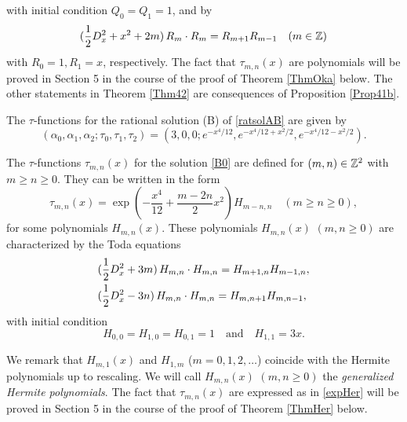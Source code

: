 with initial condition 
$ Q_0=Q_1=1 $, and by 
\begin{equation}
(\frac{1}{2}D_x^2+x^2+2m)\, 
R_{m}\cdot R_{m}=R_{m+1}R_{m-1}\quad(m\in{\Bbb Z})
\end{equation}
with $R_0=1, R_1=x$, respectively.
The fact that $\tau_{m,n}(x)$ are polynomials will be proved in 
Section 5 in the course of the proof of Theorem \ref{ThmOka} below. 
The other statements in Theorem \ref{Thm42} are consequences of 
Proposition \ref{Prop41b}.
\par\smallskip
The $\tau$-functions for the rational solution (B) of \eqref{ratsolAB} 
are given by
\begin{equation}\label{B0}
(\alpha_0,\alpha_1,\alpha_2; \tau_0,\tau_1,\tau_2)=
(3,0,0; e^{-x^4/12}, e^{-x^4/12+x^2/2},e^{-x^4/12-x^2/2}). 
\end{equation}
\begin{thm} \label{Thm43}
The $\tau$-functions $\tau_{m,n}(x)$ for the solution \eqref{B0}
are defined for $(m,n)\in{\Bbb Z}^2$ with  $m\ge n\ge0$. 
They can be written in the form
\begin{equation}\label{expHer}
\tau_{m,n}(x)=\exp\left(-\frac{x^4}{12}+\frac{m-2n}{2}x^2\right) H_{m-n,n}
\quad(m\ge n\ge 0), 
\end{equation}  
for some polynomials $H_{m,n}(x)$. 
These polynomials $H_{m,n}(x)$ $(m,n\ge 0)$ are characterized by 
the Toda equations
\begin{equation}
\begin{align}
&(\frac{1}{2}D_x^2+3m)\, 
H_{m,n}\cdot H_{m,n}=H_{m+1,n} H_{m-1,n},\\
&(\frac{1}{2}D_x^2-3n)\, 
H_{m,n}\cdot H_{m,n}=H_{m,n+1}H_{m,n-1},\notag
\end{align}
\end{equation}
with initial condition
\begin{equation}
H_{0,0}=H_{1,0}=H_{0,1}=1\quad \mbox{and}\quad
H_{1,1}=3x.
\end{equation}
\end{thm}
\medskip\noindent
We remark that $H_{m,1}(x)$ and $H_{1,m}$ ($m=0,1,2,\ldots$) coincide with the 
Hermite polynomials up to rescaling. 
We will call $H_{m,n}(x)$ $(m,n\ge 0)$ the {\em generalized Hermite polynomials}. 
The fact that $\tau_{m,n}(x)$ are expressed as in \eqref{expHer} will be 
proved in Section 5 in the course of the proof of Theorem \ref{ThmHer} below.  
\par\medskip
